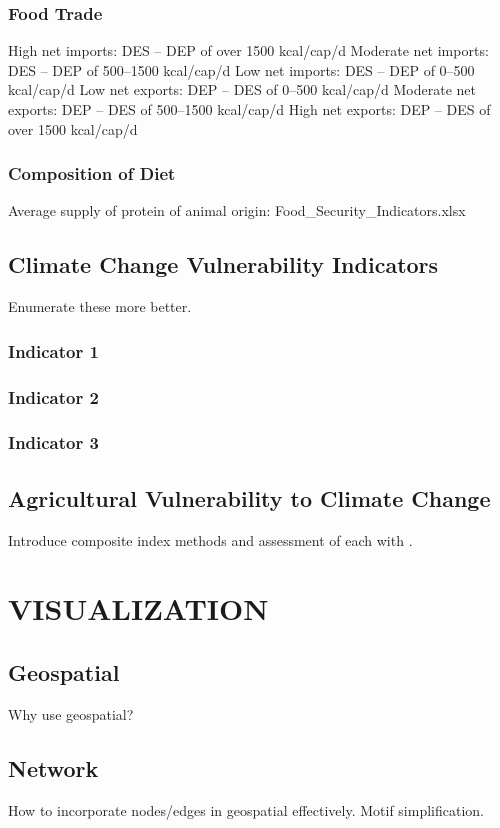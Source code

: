 \subsubsection{Food Trade}
High net imports: DES – DEP of over 1500 kcal/cap/d
Moderate net imports: DES – DEP of 500–1500 kcal/cap/d
Low net imports: DES – DEP of 0–500 kcal/cap/d
Low net exports: DEP – DES of 0–500 kcal/cap/d
Moderate net exports: DEP – DES of 500–1500 kcal/cap/d
High net exports: DEP – DES of over 1500 kcal/cap/d \cite{porkka2013food}
\subsubsection{Composition of Diet}
Average supply of protein of animal origin: Food\_Security\_Indicators.xlsx

\subsection{Climate Change Vulnerability Indicators}
Enumerate these more better.
\subsubsection{Indicator 1}
\subsubsection{Indicator 2}
\subsubsection{Indicator 3}

\subsection{Agricultural Vulnerability to Climate Change}
Introduce composite index methods and assessment of each with \cite{wirehn2015assessment}.
\section{VISUALIZATION}
\subsection{Geospatial}
Why use geospatial?
\subsection{Network}
How to incorporate nodes/edges in geospatial effectively.
Motif simplification. \cite{dunne2013motif}
